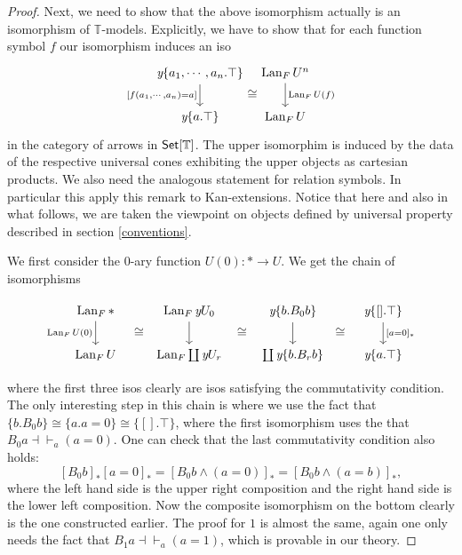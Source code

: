 \documentclass[a4paper]{amsproc}
\theoremstyle{plain}
\theoremstyle{definition}
\theoremstyle{remark}
\numberwithin{equation}{section}
\newcommand{\y}{\textit{y}}
\DeclareMathOperator{\Lan}{Lan}
\newcommand{\Set}{\textup{\textsf{Set}}}
\begin{document}
\begin{proof}
Next, we need to show that the above isomorphism actually is an isomorphism of $\mathbb{T}$-models. Explicitly, we have to show that for each function symbol $f$ our isomorphism induces an iso
\[
\begin{tikzcd}[column sep=tiny]
    {\y \{a_1,\cdots,a_n . \top \}} \arrow[d, "{[f(a_1,\cdots,a_n) = a]}"'] \arrow[r, "\cong"',phantom, shift right=7] & \Lan_F U^n \arrow[d, "\Lan_F U(f)"] \\
    \y \{a . \top \}                                                                                           & \Lan_F U
\end{tikzcd}
\]
in the category of arrows in $\Set[\mathbb{T}]$. The upper isomorphim is induced by the data of the respective universal cones exhibiting the upper objects as cartesian products. We also need the analogous statement for relation symbols. In particular this apply this remark to Kan-extensions. Notice that here and also in what follows, we are taken the viewpoint on objects defined by universal property described in section \ref{conventions}.

We first consider the 0-ary function $U(0): * \to U$. We get the chain of isomorphisms

\[
\begin{tikzcd}
\Lan_F * \arrow[d, "\Lan_F U(0)"'] \arrow[r, "\cong"',phantom, shift right=7] & \Lan_F \y U_0 \arrow[d] \arrow[r, "\cong"',phantom, shift right=7] & \y \{b . B_0 b \} \arrow[d] \arrow[r, "\cong"',phantom, shift right=7] & {\y \{[].\top\}} \arrow[d, "{[a=0]_*}"] \\
\Lan_F U                                                             & \Lan_F \coprod \y U_r                                      & \coprod \y \{ b . B_r b\}                                      & \y\{a.\top\}
\end{tikzcd}
\]

where the first three isos clearly are isos satisfying the commutativity condition. The only interesting step in this chain is where we use the fact that $\{b . B_0 b\} \cong \{a . a = 0\} \cong \{[]. \top\}$, where the first isomorphism uses the that $B_0 a \dashv \vdash_a (a = 0)$. One can check that the last commutativity condition also holds:
\[
[B_0 b]_* [a=0]_* = [B_0 b \wedge (a = 0)]_* = [B_0 b \wedge (a=b)]_*,
\]
where the left hand side is the upper right composition and the right hand side is the lower left composition. Now the composite isomorphism on the bottom clearly is the one constructed earlier. The proof for $1$ is almost the same, again one only needs the fact that $B_1 a \dashv \vdash_a (a = 1)$, which is provable in our theory.


\end{proof}
\end{document}

